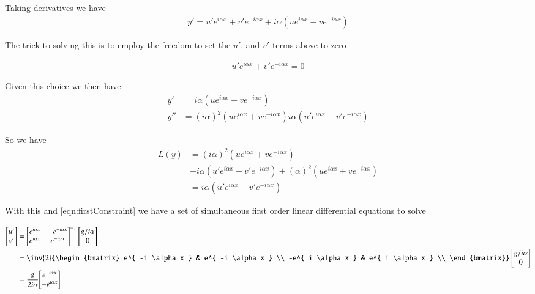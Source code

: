 \documentclass{article}
\begin{document}
Taking derivatives we have
\begin{align*}
y' = u' e^{ i \alpha x } + v' e^{ -i \alpha x } + i \alpha (u e^{ i \alpha x } - v e^{ -i \alpha x })
\end{align*}

The trick to solving this is to employ the freedom to set the $u'$, and $v'$ terms above to zero

\begin{align}\label{eqn:firstConstraint}
u' e^{ i \alpha x } + v' e^{ -i \alpha x } = 0
\end{align}

Given this choice we then have
\begin{align*}
y' &= i \alpha (u e^{ i \alpha x } - v e^{ -i \alpha x }) \\
y'' &=
(i \alpha)^2 (u e^{ i \alpha x } + v e^{ -i \alpha x })
i \alpha (u' e^{ i \alpha x } - v' e^{ -i \alpha x })
\end{align*}

So we have
\begin{align*}
L(y)
&=
(i \alpha)^2 (u e^{ i \alpha x } + v e^{ -i \alpha x })  \\
&+i \alpha (u' e^{ i \alpha x } - v' e^{ -i \alpha x })
+ (\alpha)^2 (u e^{ i \alpha x } + v e^{ -i \alpha x })  \\
&=
i \alpha (u' e^{ i \alpha x } - v' e^{ -i \alpha x })
\end{align*}

With this and \ref{eqn:firstConstraint} we have a set of simultaneous first order linear differential equations to solve

\begin{align*}
\begin{bmatrix}
u' \\
v' \\
\end{bmatrix}
&=
{\begin{bmatrix}
 e^{ i \alpha x } &- e^{ -i \alpha x } \\
 e^{ i \alpha x } &  e^{ -i \alpha x } \\
\end{bmatrix}}^{-1}
\begin{bmatrix}
{g}/{i \alpha} \\
0 \\
\end{bmatrix} \\
&=
\inv{2}
{\begin{bmatrix}
 e^{ -i \alpha x } & e^{ -i \alpha x } \\
 -e^{ i \alpha x } &  e^{ i \alpha x } \\
\end{bmatrix}}
\begin{bmatrix}
{g}/{i \alpha} \\
0 \\
\end{bmatrix} \\
&=
\frac{g}{2 i \alpha}
{\begin{bmatrix}
 e^{ -i \alpha x } \\
 -e^{ i \alpha x } \\
\end{bmatrix}}
\end{align*}
\end{document}
